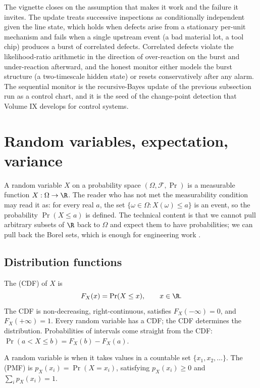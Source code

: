 The vignette closes on the assumption that makes it work and the failure
it invites. The update treats successive inspections as conditionally
independent given the line state, which holds when defects arise from a
stationary per-unit mechanism and fails when a single upstream event (a
bad material lot, a tool chip) produces a burst of correlated defects.
Correlated defects violate the likelihood-ratio arithmetic in the
direction of over-reaction on the burst and under-reaction afterward, and
the honest monitor either models the burst structure (a two-timescale
hidden state) or resets conservatively after any alarm. The sequential
monitor is the recursive-Bayes update of the previous subsection run as a
control chart, and it is the seed of the change-point detection that
Volume IX develops for control systems.

\section{Random variables, expectation, variance}

A random variable $X$ on a probability space $(\Omega, \mathcal{F},
\Pr)$ is a measurable function $X : \Omega \to \R$. The reader who
has not met the measurability condition may read it as: for every
real $a$, the set $\{\omega \in \Omega : X(\omega) \leq a\}$ is an
event, so the probability $\Pr(X \leq a)$ is defined. The technical
content is that we cannot pull arbitrary subsets of $\R$ back to
$\Omega$ and expect them to have probabilities; we can pull back
the Borel sets, which is enough for engineering work
\cite[ch.~4]{text:wasserman2004}.

\subsection{Distribution functions}

The  (CDF) of $X$ is
\[
F_{X}(x) = \Pr(X \leq x), \qquad x \in \R.
\]
The CDF is non-decreasing, right-continuous, satisfies $F_{X}(-\infty)
= 0$, and $F_{X}(+\infty) = 1$. Every random variable has a CDF; the
CDF determines the distribution. Probabilities of intervals come
straight from the CDF: $\Pr(a < X \leq b) = F_{X}(b) - F_{X}(a)$.

A random variable is  when it takes values in a
countable set $\{x_{1}, x_{2}, \ldots\}$. The  (PMF) is $p_{X}(x_{i}) = \Pr(X = x_{i})$, satisfying
$p_{X}(x_{i}) \geq 0$ and $\sum_{i} p_{X}(x_{i}) = 1$.

